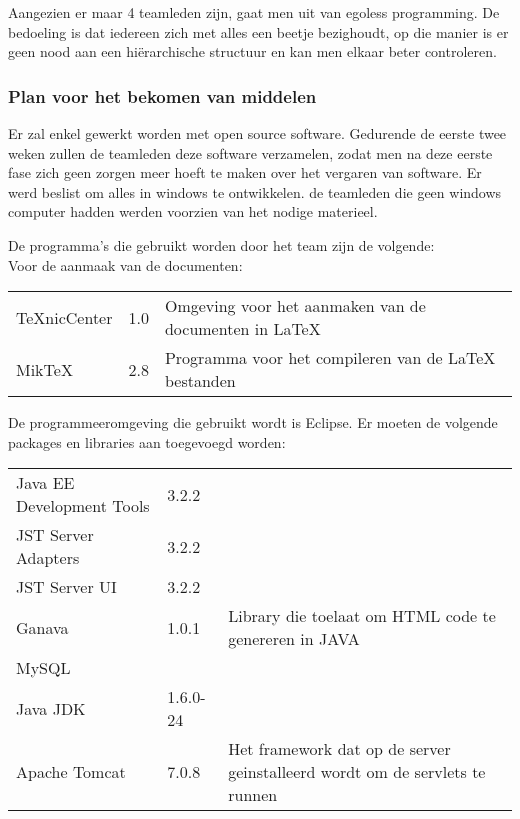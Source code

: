 \documentclass{article}
\begin{document}
Aangezien er maar 4 teamleden zijn, gaat men uit van egoless programming. De bedoeling is dat iedereen zich met alles een beetje bezighoudt, op die manier is er geen nood aan een hi\"{e}rarchische structuur en kan men elkaar beter controleren. 

\subsubsection{Plan voor het bekomen van middelen}

Er zal enkel gewerkt worden met open source software. Gedurende de eerste twee weken zullen de teamleden deze software verzamelen, zodat men na deze eerste fase zich geen zorgen meer hoeft te maken over het vergaren van software. Er werd beslist om alles in windows te ontwikkelen. de teamleden die geen windows computer hadden werden voorzien van het nodige materieel.

De programma's die gebruikt worden door het team zijn de volgende: \\

Voor de aanmaak van de documenten:
\begin{center}
\begin{tabular}{|p{4cm}|p{1.5cm}|p{6cm}|}
\hline
TeXnicCenter & 1.0 & Omgeving voor het aanmaken van de documenten in LaTeX \\
\hdashline[1pt/5pt] 
MikTeX & 2.8 & Programma voor het compileren van de LaTeX bestanden  \\
\hline
\end{tabular}
\end{center}

De programmeeromgeving die gebruikt wordt is Eclipse. Er moeten de volgende packages en libraries aan toegevoegd worden:
\begin{center}
\begin{tabular}{|p{4cm}|p{1.5cm}|p{6cm}|}
\hline
Java EE Development Tools & 3.2.2 &   \\
\hdashline[1pt/5pt]    
JST Server Adapters & 3.2.2 &  \\
\hdashline[1pt/5pt] 
JST Server UI & 3.2.2 &  \\
\hdashline[1pt/5pt] 
Ganava & 1.0.1 & Library die toelaat om HTML code te genereren in JAVA \\
\hdashline[1pt/5pt] 
MySQL & & \\
\hline
Java JDK & 1.6.0-24 &  \\
\hdashline[1pt/5pt] 
Apache Tomcat & 7.0.8 & Het framework dat op de server geinstalleerd wordt om de servlets te runnen \\
\hline
\end{tabular}
\end{center}
\end{document}
